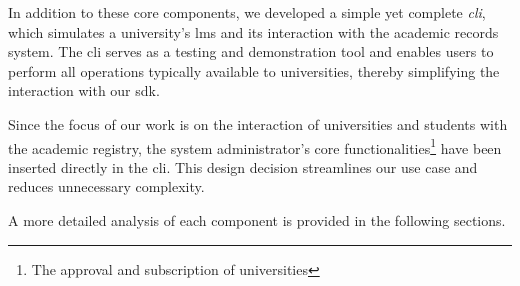 In addition to these core components, we developed a simple yet complete \textit{\acrfull{cli}}, which simulates a university's \acrshort{lms} and its interaction with the academic records system. The \acrshort{cli} serves as a testing and demonstration tool and enables users to perform all operations typically available to universities, thereby simplifying the interaction with our \acrshort{sdk}.

Since the focus of our work is on the interaction of universities and students with the academic registry, the system administrator's core functionalities\footnote{The approval and subscription of universities} have been inserted directly in the \acrshort{cli}. This design decision streamlines our use case and reduces unnecessary complexity.

A more detailed analysis of each component is provided in the following sections.
